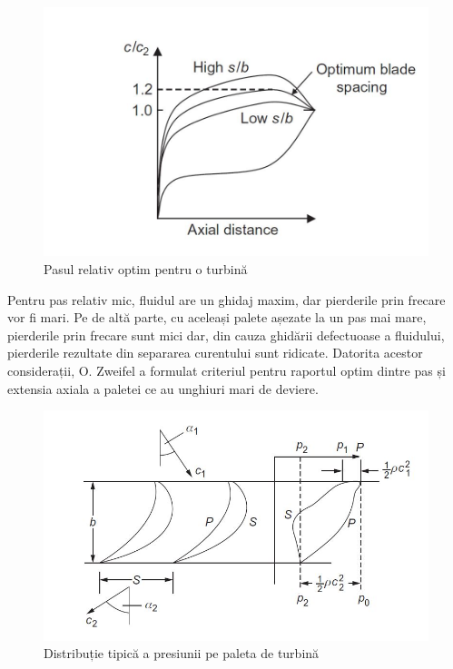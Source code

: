\begin{figure}[h]
	\centering
	\includegraphics[scale=0.35]{figures/pasul_relativ_optim.jpg}
	\caption{Pasul relativ optim pentru o turbină \cite{hall2013fluid}}
	\label{Pasul relativ optim pentru o turbină}
\end{figure}

Pentru pas relativ mic, fluidul are un ghidaj maxim, dar pierderile prin frecare vor fi mari. Pe de altă parte, cu aceleași palete așezate la un pas mai mare, pierderile prin frecare sunt mici dar, din cauza ghidării defectuoase a fluidului, pierderile rezultate din separarea curentului sunt ridicate. Datorita acestor considerații, O. Zweifel \cite{zweifel1945frage} a formulat criteriul pentru raportul optim dintre pas și extensia axiala a paletei ce au unghiuri mari de deviere.

\begin{figure}[h]
	\centering
	\includegraphics[scale=0.5]{figures/distributia_presiunii.jpg}
	\caption{Distribuție tipică a presiunii pe paleta de turbină \cite{hall2013fluid}}
	\label{Distribuție tipică a presiunii pe paleta de turbină}
\end{figure}

